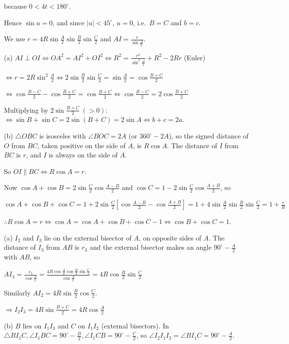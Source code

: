   because $0 < 4t < 180^\circ$.

  Hence $\sin u = 0$, and since $|u| < 45^\circ$, $u = 0$, i.e.\ $B = C$ and $b = c$.
\item We use $r = 4R\sin\frac{A}{2}\sin\frac{B}{2}\sin\frac{C}{2}$ and $AI = \frac{r}{\sin\frac{A}{2}}$.

  (a) $AI\perp OI\iff OA^2 = AI^2 + OI^2\iff R^2 = \frac{r^2}{\sin^2\frac{A}{2}} + R^2 - 2Rr$ (Euler)

  $\iff r = 2R\sin^2\frac{A}{2}\iff 2\sin\frac{B}{2}\sin\frac{C}{2} = \sin\frac{A}{2} = \cos\frac{B + C}{2}$

  $\iff \cos\frac{B - C}{2} - \cos\frac{B + C}{2} = \cos\frac{B + C}{2}\iff \cos\frac{B - C}{2} =
  2\cos\frac{B + C}{2}$

  Multiplying by $2\sin\frac{B + C}{2}\ (> 0)$: $\iff \sin B + \sin C = 2\sin(B + C) = 2\sin A\iff b + c = 2a$.

  (b) $\triangle OBC$ is isosceles with $\angle BOC = 2A$ (or $360^\circ - 2A$), so the signed distance of $O$
  from $BC$, taken positive on the side of $A$, is $R\cos A$. The distance of $I$ from $BC$ is $r$, and $I$
  is always on the side of $A$.

  So $OI\parallel BC\iff R\cos A = r$.

  Now $\cos A + \cos B = 2\sin\frac{C}{2}\cos\frac{A - B}{2}$ and $\cos C = 1 - 2\sin\frac{C}{2}\cos\frac{A
  + B}{2}$, so

  $\cos A + \cos B + \cos C = 1 + 2\sin\frac{C}{2}\left[\cos\frac{A - B}{2} - \cos\frac{A + B}{2}\right] = 1 +
  4\sin\frac{A}{2}\sin\frac{B}{2}\sin\frac{C}{2} = 1 + \frac{r}{R}$

  $\therefore R\cos A = r\iff \cos A = \cos A + \cos B + \cos C - 1\iff \cos B + \cos C = 1$.
\item (a) $I_2$ and $I_3$ lie on the external bisector of $A$, on opposite sides of $A$. The distance of $I_3$
  from $AB$ is $r_3$ and the external bisector makes an angle $90^\circ - \frac{A}{2}$ with $AB$, so

  $AI_3 = \frac{r_3}{\cos\frac{A}{2}} = \frac{4R\cos\frac{A}{2}\cos\frac{B}{2}\sin\frac{C}{2}}{\cos\frac{A}{2}}
  = 4R\cos\frac{B}{2}\sin\frac{C}{2}$

  Similarly $AI_2 = 4R\sin\frac{B}{2}\cos\frac{C}{2}$.

  $\Rightarrow I_2I_3 = 4R\sin\frac{B + C}{2} = 4R\cos\frac{A}{2}$

  (b) $B$ lies on $I_1I_3$ and $C$ on $I_1I_2$ (external bisectors). In $\triangle BI_1C, \angle I_1BC =
  90^\circ - \frac{B}{2}, \angle I_1CB = 90^\circ - \frac{C}{2}$, so $\angle I_2I_1I_3 = \angle BI_1C =
  90^\circ - \frac{A}{2}$.

